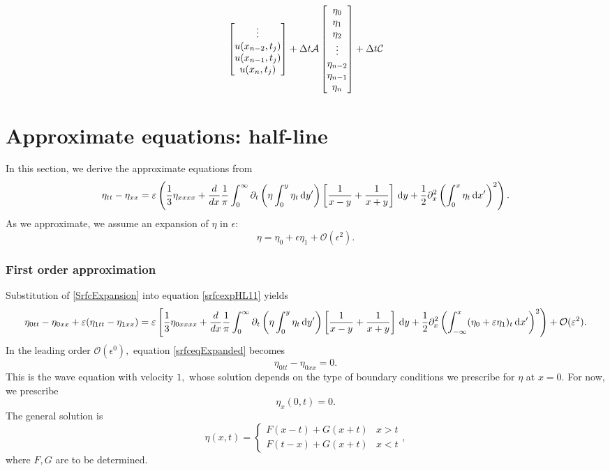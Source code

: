 \documentclass[10pt,reqno,oneside,a4paper, landscape]{article}
\begin{document}
\begin{align*}
\begin{bmatrix}
\vdots \\
u(x_{n-2}, t_{j}) \\
u(x_{n-1}, t_{j}) \\
u(x_n, t_{j}) 
\end{bmatrix} 
+ \Delta t \mathcal{A} \begin{bmatrix}
\eta_0 \\
\eta_1 \\
\eta_2 \\
\vdots \\
\eta_{n-2} \\
\eta_{n-1} \\
\eta_{n}
\end{bmatrix}
+ \Delta t \mathcal{C}
\end{align*}

\section{Approximate equations: half-line}

In this section, we derive the approximate equations from
\begin{equation}\label{srfcexpHL11}
\eta_{tt} - \eta_{xx} = \varepsilon \left( \frac{1}{3} \eta_{xxxx}  + \frac{d}{dx} \frac{1}{\pi} \int_0^\infty \partial_t \left( \eta \int^{y}_0\eta_{t} \,\mathrm{d} y' \right) \left[ \frac{1}{x-y} + \frac{1}{x+y} \right] \,\mathrm{d} y + \frac{1}{2} \partial^2_x\left(\int^{x}_0\eta_{t} \,\mathrm{d} x' \right)^2\right). 
\end{equation}
As we approximate, we assume an expansion of $\eta$ in $\epsilon:$
\begin{equation}\label{SrfcExpansion}
\eta = \eta_0 + \epsilon \eta_1 + \mathcal{O}(\epsilon^2).
\end{equation}
\subsubsection*{First order approximation}
Substitution of \eqref{SrfcExpansion} into equation \eqref{srfcexpHL11} yields
\begin{equation}\label{srfceqExpanded}
\eta_{0tt} - \eta_{0xx} +\varepsilon(\eta_{1tt} - \eta_{1xx})= \varepsilon \left[ \frac{1}{3}\eta_{0xxxx} +  \frac{d}{dx} \frac{1}{\pi} \int_0^\infty \partial_t \left( \eta \int^{y}_0\eta_{t} \,\mathrm{d} y' \right) \left[ \frac{1}{x-y} + \frac{1}{x+y} \right] \,\mathrm{d} y+ \frac{1}{2} \partial^2_x \left( \int^{x}_{-\infty} (\eta_0 + \varepsilon \eta_1)_t \,\mathrm{d} x' \right)^2\right) + \mathcal{O}(\varepsilon^2). 
\end{equation}
In the leading order $\mathcal{O}(\epsilon^0),$ equation \eqref{srfceqExpanded} becomes
\begin{equation}\label{1stOrderApprox}
\eta_{0tt} - \eta_{0xx} = 0.
\end{equation}
This is the wave equation with velocity $1,$ whose solution depends on the type of boundary conditions we prescribe for $\eta$ at $x=0.$ For now, we prescribe 
\[ \eta_x(0,t) = 0.\]
The general solution is 
\[ \eta(x,t) = \begin{cases} F(x-t) + G(x+t) & x>t \\ F(t-x) + G(x+t) & x<t \end{cases}, \] 
where $F,G$ are to be determined. 
\end{document}
